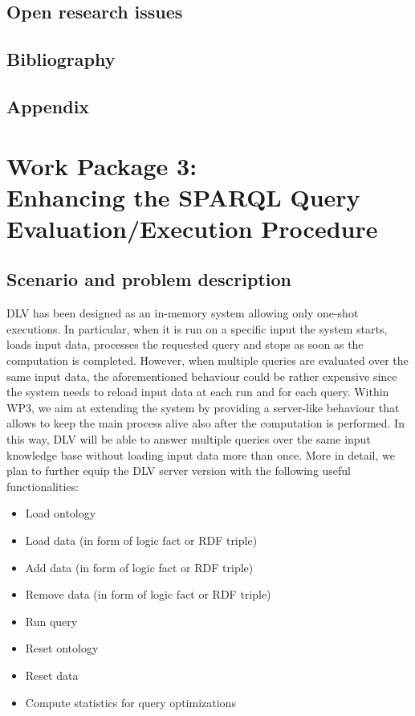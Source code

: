 \documentclass[oneside]{book}
\begin{document}
\chapter{Open research issues}
\chapter{Bibliography}
\chapter{Appendix}


\setcounter{chapter}{0}

\part*{Work Package 3:\\Enhancing the SPARQL Query Evaluation/Execution Procedure}

\chapter{Scenario and problem description}

DLV has been designed as an in-memory system allowing only one-shot executions. In particular, when it is run on a specific input the system starts, loads input data, processes the requested query and stops as soon as the computation is completed. However, when multiple queries are evaluated over the same input data, the aforementioned behaviour could be rather expensive since the system needs to reload input data at each run and for each query. Within WP3, we aim at extending the system by providing a server-like behaviour that allows to keep the main process alive also after the computation is performed. In this way, DLV will be able to answer multiple queries over the same input knowledge base without loading input data more than once. More in detail, we plan to further equip the DLV server version with the following useful functionalities:
\begin{itemize}
\item Load ontology
\item Load data (in form of logic fact or RDF triple)
\item Add data (in form of logic fact or RDF triple)
\item Remove data (in form of logic fact or RDF triple)
\item Run query
\item Reset ontology
\item Reset data
\item Compute statistics for query optimizations
\end{itemize}
\end{document}
